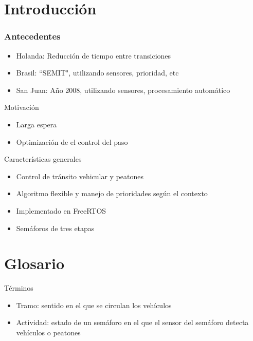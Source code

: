 \section{Introducción} 

\begin{frame}
	\frametitle{Antecedentes}
	\begin{itemize}
		\item Holanda: Reducción de tiempo entre transiciones %
		\item Brasil: ``SEMIT", utilizando sensores, prioridad, etc %
		\item San Juan: Año 2008, utilizando sensores, procesamiento automático
	\end{itemize}
\end{frame}


\begin{frame}
	\begin{block}{Motivación}
		\begin{itemize}
			\item Larga espera
			\item Optimización de el control del paso
		\end{itemize}
	\end{block}

	\begin{block}{Características generales}
		\begin{itemize}
			\item Control de tránsito vehicular y peatones
			\item Algoritmo flexible y manejo de prioridades según el contexto
			\item Implementado en FreeRTOS
			\item Semáforos de tres etapas
		\end{itemize}
	\end{block}
\end{frame}

\section{Glosario}

\begin{frame}
	\begin{block}{Términos}
		\begin{itemize}
			\item Tramo: sentido en el que se circulan los vehículos
			\item Actividad: estado de un semáforo en el que el sensor del semáforo detecta vehículos o peatones
		\end{itemize}
	\end{block}
\end{frame}

